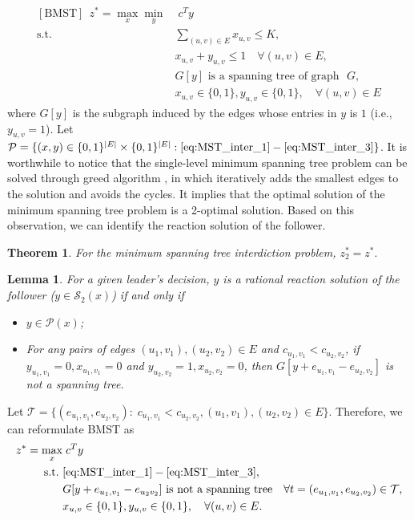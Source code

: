 \documentclass[11pt]{article}
\newtheorem{theorem}{Theorem}
\newtheorem{lemma}{Lemma}
\newcommand{\T}{\mathcal{T}}
\newcommand{\Pp}{\mathcal{P}}
\newcommand{\Ss}{\mathcal{S}}
\begin{document}
\begin{subequations}
	\begin{align}
	[\text{BMST}]~~z^* = \max_x\min_y &\; c^T y \nonumber\\
	\text{s.t.~}&  \sum_{(u,v)\in E} x_{u,v} \leq K, \label{eq:MST_inter_1}\\
	& x_{u,v} + y_{u,v} \leq 1 \quad \forall (u,v)\in E, \label{eq:MST_inter_2}\\
	& G[y] \text{~is a spanning tree of graph~ } G, \label{eq:MST_inter_3}\\
	& x_{u,v} \in \{0,1\}, y_{u,v} \in \{0, 1\}, \quad \forall (u,v) \in E \nonumber
	\end{align}
\end{subequations}
where $G[y]$ is the subgraph induced by the edges whose entries in $y$ is $1$ (i.e., $y_{u,v} =1 $).  Let $\Pp = \{(x, y) \in \{0,1\}^{|E|}\times \{0,1\}^{|E|}: \eqref{eq:MST_inter_1} - \eqref{eq:MST_inter_3} \}$. It is worthwhile to notice that the single-level minimum spanning tree problem can be solved through greed algorithm \cite{ahuja1988network}, in which iteratively adds the smallest edges to the solution and avoids the cycles. It implies that the optimal solution of the minimum spanning tree problem is a 2-optimal solution. Based on this observation, we can identify the reaction solution of the follower.

\begin{theorem}
	For the minimum spanning tree interdiction problem, $z_2^* = z^*.$
\end{theorem}


\begin{lemma}
	For a given leader's decision, $y$ is a rational reaction solution of the follower ($y \in \Ss_2(x)$) if and only if 
	\begin{itemize}
		\item[\emph{(i)}] $y \in \Pp(x)$;
		\item[\emph{(ii)}] For any pairs of edges $(u_1, v_1), (u_2, v_2) \in E$ and $c_{u_1,v_1} < c_{u_2,v_2}$, if $y_{u_1,v_1} = 0, x_{u_1,v_1}=0$ and $y_{u_2,v_2} = 1, x_{u_2,v_2}=0$, then $G[y + e_{u_1,v_1} - e_{u_2,v_2}]$ is not a spanning tree. 
	\end{itemize}
\end{lemma}

Let $\T = \{ (e_{u_1, v_1}, e_{u_2, v_2}):\; c_{u_1,v_1} < c_{u_2,v_2}, (u_1, v_1), (u_2, v_2) \in E \}$. Therefore, we can reformulate BMST as 
\begin{align*}
z^* = \max_x & \; c^T y \\
\text{s.t.~} & \eqref{eq:MST_inter_1} - \eqref{eq:MST_inter_3}, \\
& G[y + e_{u_1, v_1} - e_{u_2v_2}] \text{~is not a spanning tree} \quad \forall t = (e_{u_1, v_1}, e_{u_2, v_2}) \in \T, \\
& x_{u,v} \in \{0,1\}, y_{u,v} \in \{0, 1\}, \quad \forall (u,v) \in E.
\end{align*}
\end{document}
